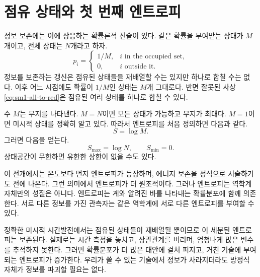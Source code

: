 \begin{classroomqa}
\end{classroomqa}

\section{점유 상태와 첫 번째 엔트로피}

정보 보존에는 이에 상응하는 확률론적 진술이 있다. 같은 확률을 부여받는 상태가 \(M\)개이고, 전체 상태는 \(N\)개라고 하자.
\begin{equation}
 p_i=
 \begin{cases}
 1/M, & i\text{ in the occupied set},\\
 0, & i\text{ outside it}.
 \end{cases}
 \label{eq:sm1-uniform-occupied}
\end{equation}
정보를 보존하는 갱신은 점유된 상태들을 재배열할 수는 있지만 하나로 합칠 수는 없다. 이후 어느 시점에도 확률이 \(1/M\)인 상태는 \(M\)개 그대로다. 반면 잘못된 사상 \eqref{eq:sm1-all-to-red}은 점유된 여러 상태를 하나로 합칠 수 있다.

수 \(M\)는 무지를 나타낸다. \(M=N\)이면 모든 상태가 가능하고 무지가 최대다. \(M=1\)이면 미시적 상태를 정확히 알고 있다. 따라서 엔트로피를 처음 정의하면 다음과 같다.
\begin{equation}
 S=\log M.
 \label{eq:sm1-entropy-logm}
\end{equation}
그러면 다음을 얻는다.
\begin{equation}
 S_{\max}=\log N,
 \qquad
 S_{\min}=0.
\end{equation}
상태공간이 무한하면 유한한 상한이 없을 수도 있다.

이 전개에서는 온도보다 먼저 엔트로피가 등장하며, 에너지 보존을 정식으로 서술하기도 전에 나온다. 그런 의미에서 엔트로피가 더 원초적이다. 그러나 엔트로피는 역학계 자체만의 성질은 아니다. 엔트로피는 계와 알려진 바를 나타내는 확률분포에 함께 의존한다. 서로 다른 정보를 가진 관측자는 같은 역학계에 서로 다른 엔트로피를 부여할 수 있다.

정확한 미시적 시간발전에서는 점유된 상태들이 재배열될 뿐이므로 이 세분된 엔트로피는 보존된다. 실제로는 시간 측정을 놓치고, 상관관계를 버리며, 엄청나게 많은 변수를 추적하지 못한다. 그러면 확률분포가 더 많은 대안에 걸쳐 퍼지고, 거친 기술에 부여되는 엔트로피가 증가한다. 우리가 쓸 수 있는 기술에서 정보가 사라지더라도 방정식 자체가 정보를 파괴할 필요는 없다.

